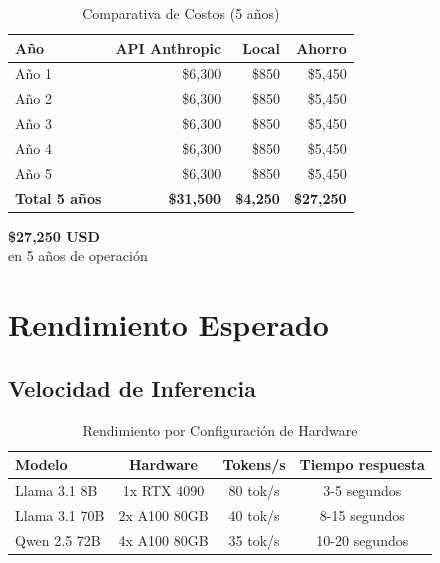 \documentclass[12pt,letterpaper]{article}
\begin{document}
\begin{table}[h]
\centering
\caption{Comparativa de Costos (5 a\~nos)}
\begin{tabular}{@{}lrrr@{}}
\toprule
\textbf{A\~no} & \textbf{API Anthropic} & \textbf{Local} & \textbf{Ahorro} \\
\midrule
A\~no 1 & \$6,300 & \$850 & \$5,450 \\
A\~no 2 & \$6,300 & \$850 & \$5,450 \\
A\~no 3 & \$6,300 & \$850 & \$5,450 \\
A\~no 4 & \$6,300 & \$850 & \$5,450 \\
A\~no 5 & \$6,300 & \$850 & \$5,450 \\
\midrule
\textbf{Total 5 a\~nos} & \textbf{\$31,500} & \textbf{\$4,250} & \textbf{\$27,250} \\
\bottomrule
\end{tabular}
\end{table}

\begin{tcolorbox}[colback=secondary!20, colframe=secondary, title=\textbf{Ahorro Proyectado}]
\begin{center}
\textbf{\Huge \$27,250 USD}\\[0.3cm]
\large en 5 a\~nos de operaci\'on
\end{center}
\end{tcolorbox}

\section{Rendimiento Esperado}

\subsection{Velocidad de Inferencia}

\begin{table}[h]
\centering
\caption{Rendimiento por Configuraci\'on de Hardware}
\begin{tabular}{@{}lccc@{}}
\toprule
\textbf{Modelo} & \textbf{Hardware} & \textbf{Tokens/s} & \textbf{Tiempo respuesta} \\
\midrule
Llama 3.1 8B & 1x RTX 4090 & 80 tok/s & 3-5 segundos \\
Llama 3.1 70B & 2x A100 80GB & 40 tok/s & 8-15 segundos \\
Qwen 2.5 72B & 4x A100 80GB & 35 tok/s & 10-20 segundos \\
\bottomrule
\end{tabular}
\end{table}
\end{document}

